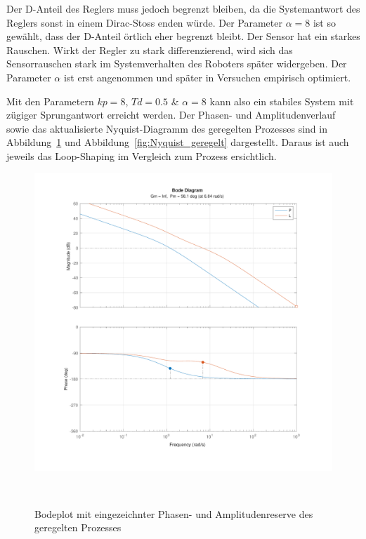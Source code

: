 \documentclass[main.tex]{subfiles} %
\begin{document}
Der D-Anteil des Reglers muss jedoch begrenzt bleiben, da die Systemantwort des
Reglers sonst in einem Dirac-Stoss enden würde. Der Parameter $\alpha = 8$ ist
so gewählt, dass der D-Anteil örtlich eher begrenzt bleibt. Der Sensor hat ein
starkes Rauschen. Wirkt der Regler zu stark differenzierend, wird sich das
Sensorrauschen stark im Systemverhalten des Roboters später widergeben. Der
Parameter $\alpha$ ist erst angenommen und später in Versuchen empirisch
optimiert.

Mit den Parametern $kp = 8$, $Td = 0.5$ \& $\alpha = 8$ kann also ein stabiles
System mit zügiger Sprungantwort erreicht werden. Der Phasen- und
Amplitudenverlauf sowie das aktualisierte Nyquist-Diagramm des geregelten
Prozesses sind in Abbildung~\ref{fig:MarginPlot_geregelt} und
Abbildung~\ref{fig:Nyquist_geregelt} dargestellt. Daraus ist auch jeweils das
Loop-Shaping im Vergleich zum Prozess ersichtlich.

\begin{figure}[H]
    \centering
    \includegraphics[width=1\linewidth]{fig_Parametrierung_Linienfolgeregler/Bode_Plot_Prozess_geregelt.pdf}
    \caption{Bodeplot mit eingezeichnter Phasen- und Amplitudenreserve des geregelten Prozesses}~\label{fig:MarginPlot_geregelt}
\end{figure}
\end{document}
